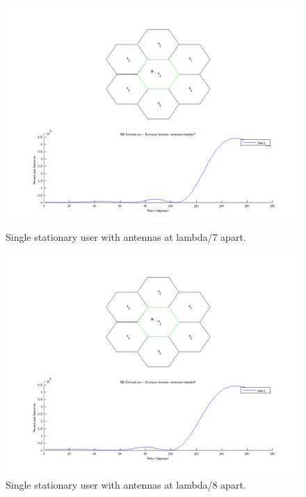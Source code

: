 \documentclass{article}
\begin{document}
\begin{figure}[h]
\centerline{\includegraphics[width=5in]{doc/partB7.png}}
\caption{Single stationary user with antennas at lambda/7 apart.}
\label{partb7}
\end{figure}

\begin{figure}[h]
\centerline{\includegraphics[width=5in]{doc/partB8.png}}
\caption{Single stationary user with antennas at lambda/8 apart.}
\label{partb8}
\end{figure}
\end{document}
